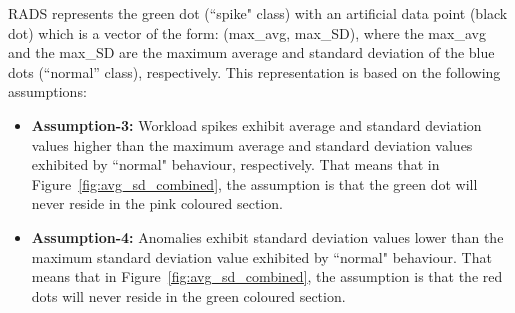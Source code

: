RADS represents the green dot (``spike" class) with an artificial data point (black dot) which is a vector of the form: (max\_avg, max\_SD), where the max\_avg and the max\_SD are the maximum average and standard deviation of the blue dots (``normal'' class), respectively. This representation is based on the following assumptions: 

\begin{itemize} %
\item \textbf{Assumption-3:} Workload spikes exhibit average and standard deviation values higher than the maximum average and standard deviation values exhibited by ``normal" behaviour, respectively. That means that in Figure~\ref{fig:avg_sd_combined}, the assumption is that the green dot will never reside in the pink coloured section. 
\item \textbf{Assumption-4:} Anomalies exhibit standard deviation values lower than the maximum standard deviation value exhibited by ``normal" behaviour. That means that in Figure~\ref{fig:avg_sd_combined}, the assumption is that the red dots will never reside in the green coloured section. 
\end{itemize}  %

